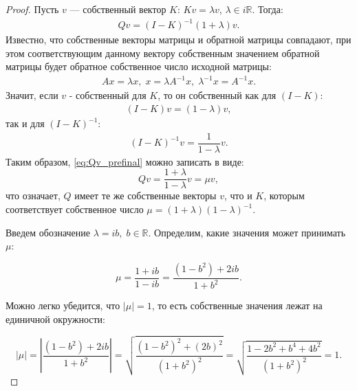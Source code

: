 \documentclass{article}
\newtheorem*{proof}{$\square$}
\newcommand{\R}{\mathbb{R}}
\begin{document}
\begin{proof}
		Пусть $v$ --- собственный вектор $K$: $Kv = \lambda v$, $\lambda \in i\R$. Тогда:
		\begin{equation}\begin{aligned}\label{eq:Qv_prefinal}
				Qv = (I - K)^{-1}(1 + \lambda) v.
		\end{aligned}\end{equation}
		Известно, что собственные векторы матрицы и обратной матрицы совпадают, при этом соответствующим данному вектору собственным значением обратной матрицы будет обратное собственное число исходной матрицы:
		\begin{equation*}\begin{aligned}
				Ax = \lambda x,\; x = \lambda A^{-1} x,\; \lambda^{-1} x = A^{-1} x.
		\end{aligned}\end{equation*}
		Значит, если $v$ - собственный для $K$, то он собственный как для $(I - K)$:
		\begin{equation*}\begin{aligned}
				(I - K) v = (1 - \lambda)v, 
		\end{aligned}\end{equation*}
		так и для $(I - K)^{-1}$:
		\begin{equation*}\begin{aligned}
				(I - K)^{-1} v = \dfrac{1}{1-\lambda} v.
		\end{aligned}\end{equation*}
		Таким образом, \eqref{eq:Qv_prefinal} можно записать в виде:
		\begin{equation}
			Qv = \frac{1 + \lambda}{1 - \lambda} v = \mu v,
		\end{equation}
		что означает, $Q$ имеет те же собственные векторы $v$, что и $K$, которым соответствует собственное число $\mu = (1 + \lambda)(1 - \lambda)^{-1}$. 
		
		Введем обозначение $\lambda = i b,\; b\in\R$. Определим, какие значения может принимать $\mu$:
		
		\begin{equation} \label{eq:mu_b}
			\mu = \frac{1 + ib}{1 - ib} = \frac{(1-b^2) + 2ib}{1+b^2}.
		\end{equation}
		
		Можно легко убедится, что $|\mu|=1$, то есть собственные значения лежат на единичной окружности:
		
		\begin{equation*}
			|\mu| = \left|\frac{(1-b^2) + 2ib}{1+b^2}\right| = \sqrt{\frac{(1-b^2)^2 + (2b)^2}{(1+b^2)^2}} = \sqrt{\frac{1 -2b^2+b^4+4b^2}{(1+b^2)^2}} = 1.
		\end{equation*}
		

\end{proof}
\end{document}
